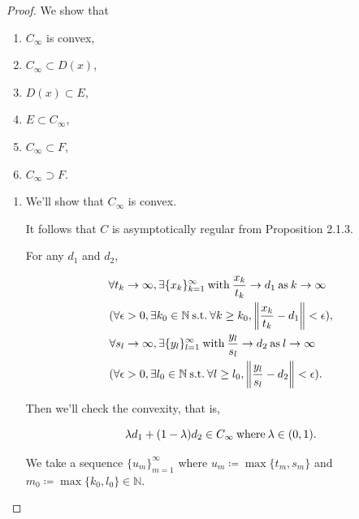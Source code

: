 \documentclass[a4paper,11pt]{jsarticle}
\newcommand{\NaturalNumberSet}{\mathbb{N}}
\newcommand{\SuchThat}{\:\text{s.t.}\:}
\begin{document}
\begin{proof}
  We show that

  \begin{enumerate}[label=\roman*,align=CenterWithParen]
    \item $C_{\infty}$ is convex,
    \item $C_{\infty} \subset D(x)$,
    \item $D(x) \subset E$,
    \item $E \subset C_{\infty}$,
    \item $C_{\infty} \subset F$,
    \item $C_{\infty} \supset F$.
  \end{enumerate}

  \begin{enumerate}[label=\roman*,align=CenterWithParen]
    \item We'll show that $C_{\infty}$ is convex.

    It follows that $C$ is asymptotically regular from Proposition 2.1.3.

    For any $d_1$ and $d_2$,

    \begin{equation}
      \begin{split}
        \forall t_k &\rightarrow \infty, \exists \{x_k\}_{k=1}^{\infty} \:\text{with}\: \frac{x_k}{t_k} \rightarrow d_1 \:\text{as}\: k \rightarrow \infty \\
        (\forall \epsilon &> 0, \exists k_0 \in \NaturalNumberSet \SuchThat \forall k \geq k_0, \left\lVert \frac{x_k}{t_k} - d_1\right\rVert < \epsilon ), \\
        \forall s_l &\rightarrow \infty, \exists \{y_l\}_{l=1}^{\infty} \:\text{with}\: \frac{y_l}{s_l} \rightarrow d_2 \:\text{as}\: l \rightarrow \infty \\
        (\forall \epsilon &> 0, \exists l_0 \in \NaturalNumberSet \SuchThat \forall l \geq l_0, \left\lVert \frac{y_l}{s_l} - d_2\right\rVert < \epsilon ). \notag
      \end{split}
    \end{equation}

    Then we'll check the convexity, that is,

    \begin{equation}
      \lambda d_1 + (1 - \lambda) d_2 \in C_{\infty} \:\text{where}\: \lambda \in (0,1). \notag
    \end{equation}

    We take a sequence $\{u_m\}_{m=1}^{\infty}$ where $u_m \coloneqq \max \{t_m,s_m\}$ and $m_0 \coloneqq \max \{k_0,l_0\} \in \NaturalNumberSet$.


\end{enumerate}
\end{proof}
\end{document}
